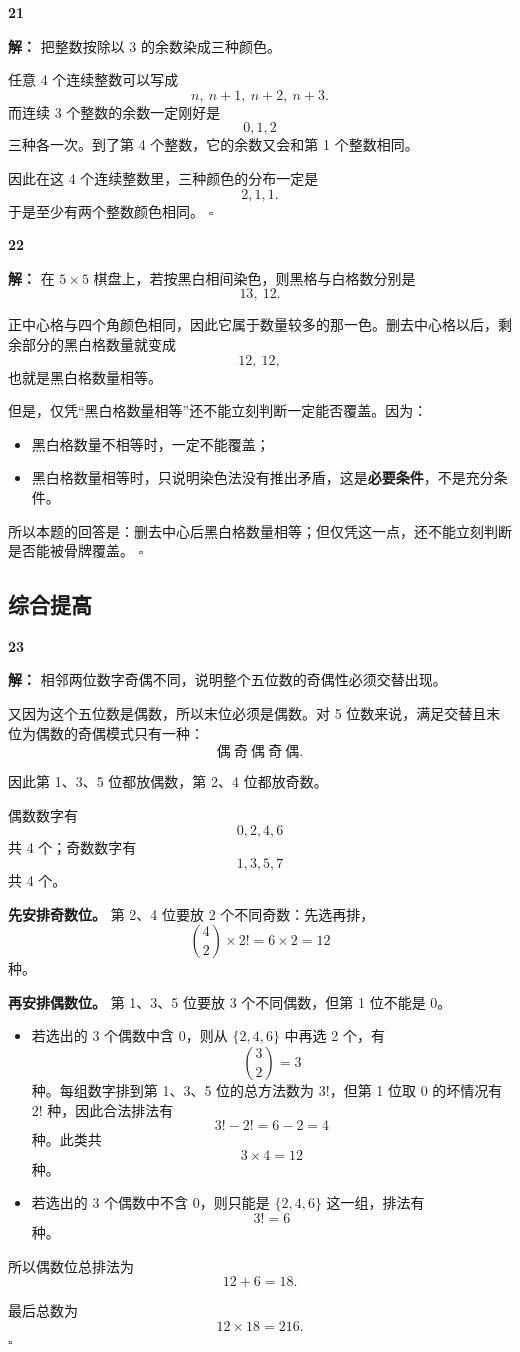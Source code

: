 \documentclass[11pt,a4paper,fontset=fandol]{ctexart}
\theoremstyle{formalexample}
\newenvironment{solution}{\par\noindent\textbf{解：}}{\hfill$\square$\par}
\begin{document}
\textbf{21}\begin{solution}
把整数按除以 3 的余数染成三种颜色。

任意 4 个连续整数可以写成
\[
n,\ n+1,\ n+2,\ n+3.
\]
而连续 3 个整数的余数一定刚好是
\[
0,1,2
\]
三种各一次。到了第 4 个整数，它的余数又会和第 1 个整数相同。

因此在这 4 个连续整数里，三种颜色的分布一定是
\[
2,1,1.
\]
于是至少有两个整数颜色相同。
\end{solution}

\textbf{22}\begin{solution}
在 $5\times 5$ 棋盘上，若按黑白相间染色，则黑格与白格数分别是
\[
13,\ 12.
\]

正中心格与四个角颜色相同，因此它属于数量较多的那一色。删去中心格以后，剩余部分的黑白格数量就变成
\[
12,\ 12,
\]
也就是黑白格数量相等。

但是，仅凭“黑白格数量相等”还不能立刻判断一定能否覆盖。因为：
\begin{itemize}
  \item 黑白格数量不相等时，一定不能覆盖；
  \item 黑白格数量相等时，只说明染色法没有推出矛盾，这是\textbf{必要条件}，不是充分条件。
\end{itemize}

所以本题的回答是：删去中心后黑白格数量相等；但仅凭这一点，还不能立刻判断是否能被骨牌覆盖。
\end{solution}

\subsection*{综合提高}

\textbf{23}\begin{solution}
相邻两位数字奇偶不同，说明整个五位数的奇偶性必须交替出现。

又因为这个五位数是偶数，所以末位必须是偶数。对 5 位数来说，满足交替且末位为偶数的奇偶模式只有一种：
\[
\text{偶}\ \text{奇}\ \text{偶}\ \text{奇}\ \text{偶}.
\]

因此第 1、3、5 位都放偶数，第 2、4 位都放奇数。

偶数数字有
\[
0,2,4,6
\]
共 4 个；奇数数字有
\[
1,3,5,7
\]
共 4 个。

\textbf{先安排奇数位。}  
第 2、4 位要放 2 个不同奇数：先选再排，
\[
\binom{4}{2}\times 2!=6\times 2=12
\]
种。

\textbf{再安排偶数位。}  
第 1、3、5 位要放 3 个不同偶数，但第 1 位不能是 0。

\begin{itemize}
  \item 若选出的 3 个偶数中含 $0$，则从 $\{2,4,6\}$ 中再选 2 个，有
  \[
  \binom{3}{2}=3
  \]
  种。每组数字排到第 1、3、5 位的总方法数为 $3!$，但第 1 位取 0 的坏情况有 $2!$ 种，因此合法排法有
  \[
  3!-2!=6-2=4
  \]
  种。此类共
  \[
  3\times 4=12
  \]
  种。
  \item 若选出的 3 个偶数中不含 $0$，则只能是 $\{2,4,6\}$ 这一组，排法有
  \[
  3!=6
  \]
  种。
\end{itemize}

所以偶数位总排法为
\[
12+6=18.
\]

最后总数为
\[
12\times 18=216.
\]
\end{solution}
\end{document}
